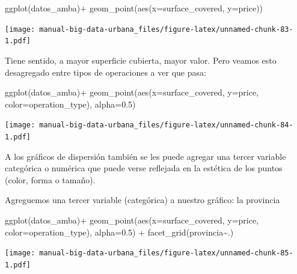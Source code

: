 \documentclass[
  spanish,
]{book}
\newenvironment{Shaded}{\begin{snugshade}}{\end{snugshade}}
\newcommand{\AttributeTok}[1]{\textcolor[rgb]{0.77,0.63,0.00}{#1}}
\newcommand{\FloatTok}[1]{\textcolor[rgb]{0.00,0.00,0.81}{#1}}
\newcommand{\FunctionTok}[1]{\textcolor[rgb]{0.00,0.00,0.00}{#1}}
\newcommand{\NormalTok}[1]{#1}
\newcommand{\SpecialCharTok}[1]{\textcolor[rgb]{0.00,0.00,0.00}{#1}}
\begin{document}
\begin{Shaded}
\begin{Highlighting}[]
\FunctionTok{ggplot}\NormalTok{(datos\_amba)}\SpecialCharTok{+}
  \FunctionTok{geom\_point}\NormalTok{(}\FunctionTok{aes}\NormalTok{(}\AttributeTok{x=}\NormalTok{surface\_covered, }\AttributeTok{y=}\NormalTok{price))}
\end{Highlighting}
\end{Shaded}

\texttt{[image: manual-big-data-urbana\_files/figure-latex/unnamed-chunk-83-1.pdf]}

Tiene sentido, a mayor superficie cubierta, mayor valor. Pero veamos esto desagregado entre tipos de operaciones a ver que pasa:

\begin{Shaded}
\begin{Highlighting}[]
\FunctionTok{ggplot}\NormalTok{(datos\_amba)}\SpecialCharTok{+}
  \FunctionTok{geom\_point}\NormalTok{(}\FunctionTok{aes}\NormalTok{(}\AttributeTok{x=}\NormalTok{surface\_covered, }\AttributeTok{y=}\NormalTok{price, }\AttributeTok{color=}\NormalTok{operation\_type), }\AttributeTok{alpha=}\FloatTok{0.5}\NormalTok{)}
\end{Highlighting}
\end{Shaded}

\texttt{[image: manual-big-data-urbana\_files/figure-latex/unnamed-chunk-84-1.pdf]}

A los gráficos de dispersión también se les puede agregar una tercer variable categórica o numérica que puede verse reflejada en la estética de los puntos (color, forma o tamaño).

Agreguemos una tercer variable (categórica) a nuestro gráfico: la provincia

\begin{Shaded}
\begin{Highlighting}[]
\FunctionTok{ggplot}\NormalTok{(datos\_amba)}\SpecialCharTok{+}
  \FunctionTok{geom\_point}\NormalTok{(}\FunctionTok{aes}\NormalTok{(}\AttributeTok{x=}\NormalTok{surface\_covered, }\AttributeTok{y=}\NormalTok{price, }\AttributeTok{color=}\NormalTok{operation\_type), }\AttributeTok{alpha=}\FloatTok{0.5}\NormalTok{) }\SpecialCharTok{+}
  \FunctionTok{facet\_grid}\NormalTok{(provincia}\SpecialCharTok{\textasciitilde{}}\NormalTok{.)}
\end{Highlighting}
\end{Shaded}

\texttt{[image: manual-big-data-urbana\_files/figure-latex/unnamed-chunk-85-1.pdf]}
\end{document}
